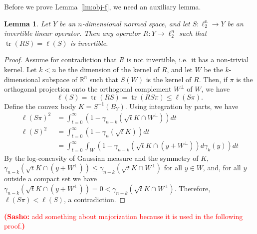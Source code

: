 \documentclass[11pt]{article}
\newtheorem{lemma}[theorem]{Lemma}
\newcommand{\R}{{\mathbb{R}}}
\DeclareMathOperator{\tr}{tr}
\newcommand{\notename}[2]{{\textcolor{red}{{\bf (#1:} {#2}{\bf ) }}}}
\newcommand{\notename}[2]{{\textcolor{red}{\footnotesize{\bf (#1:} {#2}{\bf ) }}}}
\newcommand{\snote}[1]{{\notename{Sasho}{#1}}}
\newcommand{\notename}[2]{{}}
\newcommand{\snote}[1]{}
\begin{document}
Before we prove Lemma~\ref{lm:obj-f}, we need an auxiliary lemma.
\begin{lemma}\label{lm:invertible}
  Let $Y$ be an $n$-dimensional normed space, and let $S:\ell_2^n \to
  Y$ be an invertible linear operator. Then any operator $R:Y \to
  \ell_2^n$ such that $\tr(RS) = \ell(S)$ is invertible.
\end{lemma}
\begin{proof}
  Assume for contradiction that $R$ is not invertible, i.e.~it has a
  non-trivial kernel. Let $k<n$ be the dimension of the kernel of $R$,
  and let $W$ be the $k$-dimensional subspace of $\R^n$ such that $S(W)$
  is the kernel of $R$. Then, if $\pi$ is the orthogonal projection onto
  the orthogonal complement $W^\perp$ of $W$, we have
  \[
  \ell(S) = \tr(RS) = \tr(RS\pi) \le \ell(S\pi).
  \]
  Define the convex body $K = S^{-1}(B_Y)$. Using integration by
  parts, we have
  \begin{align*}
  \ell(S\pi)^2 &= \int_{t = 0}^\infty (1-\gamma_{n-k}(\sqrt{t}K\cap W^\perp))dt\\
  \ell(S)^2 &= \int_{t = 0}^\infty (1-\gamma_n(\sqrt{t}K))dt\\
  &= \int_{t = 0}^\infty \int_{W}(1-\gamma_{n-k}(\sqrt{t}K \cap (y + W^\perp))d\gamma_{k}(y))dt
  \end{align*}
  By the log-concavity of Gaussian measure and the symmetry of $K$,
  $\gamma_{n-k}(\sqrt{t}K \cap (y + W^\perp)) \le \gamma_{n-k}(\sqrt{t}K \cap
  W^\perp)$ for all $y \in W$, and, for all $y$ outside a
  compact set we have $\gamma_{n-k}(\sqrt{t}K \cap (y + W^\perp)) = 0 <
  \gamma_{n-k}(\sqrt{t}K \cap W^\perp)$. Therefore, $\ell(S\pi) < \ell(S)$, a
  contradiction.
\end{proof}

\snote{add something about majorization because it is used in the
  following proof.}
\end{document}
